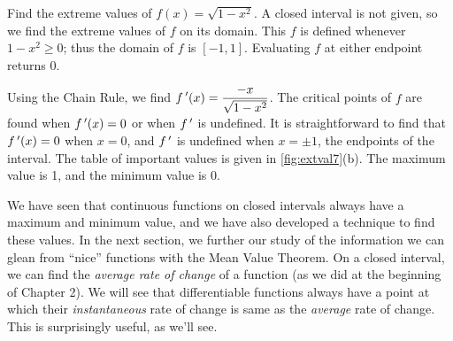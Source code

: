 \begin{example}\label{ex_extval7}%
Find the extreme values of $f(x) = \sqrt{1-x^2}$.
\solution
A closed interval is not given, so we find the extreme values of $f$ on its domain. This $f$ is defined whenever $1-x^2\geq 0$; thus the domain of $f$ is $[-1,1]$. Evaluating $f$ at either endpoint returns 0.

Using the Chain Rule, we find $\displaystyle f\,'(x) = \frac{-x}{\sqrt{1-x^2}}$. The critical points of $f$ are found when $f\,'(x) = 0$ or when $f\,'$ is undefined. It is straightforward to find that $f\,'(x) = 0$ when $x=0$, and $f\,'$ is undefined when $x=\pm 1$, the endpoints of the interval. The table of important values is given in \autoref{fig:extval7}(b). The maximum value is 1, and the minimum value is 0.
\end{example}


We have seen that continuous functions on closed intervals always have a maximum and minimum value, and we have also developed a technique to find these values. In the next section, we further our study of the information we can glean from ``nice'' functions with the Mean Value Theorem. On a closed interval, we can find the \emph{average rate of change} of a function (as we did at the beginning of Chapter 2). We will see that differentiable functions always have a point at which their \emph{instantaneous} rate of change is same as the \emph{average} rate of change. This is surprisingly useful, as we'll see.

